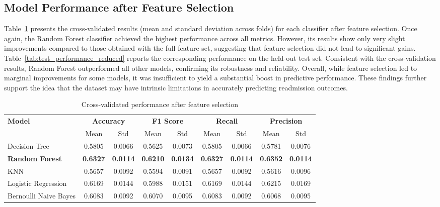 \subsection{Model Performance after Feature Selection}
Table~\ref{tab:cv_performance_reduced} presents the cross-validated results (mean and standard deviation across folds) for each classifier after feature selection. Once again, the Random Forest classifier achieved the highest performance across all metrics. However, its results show only very slight improvements compared to those obtained with the full feature set, suggesting that feature selection did not lead to significant gains.
\noindent
Table~\ref{tab:test_performance_reduced} reports the corresponding performance on the held-out test set. Consistent with the cross-validation results, Random Forest outperformed all other models, confirming its robustness and reliability.
\noindent
Overall, while feature selection led to marginal improvements for some models, it was insufficient to yield a substantial boost in predictive performance. These findings further support the idea that the dataset may have intrinsic limitations in accurately predicting readmission outcomes.

\begin{table}[ht]
\centering
\caption{Cross-validated performance after feature selection}
\label{tab:cv_performance_reduced}
\renewcommand{\arraystretch}{1.2}
\begin{tabular}{lcccccccc}
\hline
\textbf{Model} & \multicolumn{2}{c}{\textbf{Accuracy}} & \multicolumn{2}{c}{\textbf{F1 Score}} & \multicolumn{2}{c}{\textbf{Recall}} & \multicolumn{2}{c}{\textbf{Precision}} \\
 & Mean & Std & Mean & Std & Mean & Std & Mean & Std \\
\hline
Decision Tree & 0.5805 & 0.0066 & 0.5625 & 0.0073 & 0.5805 & 0.0066 & 0.5781 & 0.0076 \\
\textbf{Random Forest} & \textbf{0.6327} & \textbf{0.0114} & \textbf{0.6210} & \textbf{0.0134} & \textbf{0.6327} & \textbf{0.0114} & \textbf{0.6352} & \textbf{0.0114} \\
KNN & 0.5657 & 0.0092 & 0.5594 & 0.0091 & 0.5657 & 0.0092 & 0.5616 & 0.0096 \\
Logistic Regression & 0.6169 & 0.0144 & 0.5988 & 0.0151 & 0.6169 & 0.0144 & 0.6215 & 0.0169 \\
Bernoulli Naive Bayes & 0.6083 & 0.0092 & 0.6070 & 0.0095 & 0.6083 & 0.0092 & 0.6068 & 0.0095 \\
\hline
\end{tabular}
\end{table}

